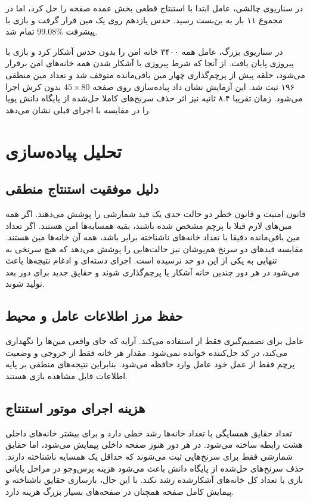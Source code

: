 \documentclass[10.5pt]{exam}
\begin{document}
در سناریوی چالشی، عامل ابتدا با استنتاج قطعی بخش عمده صفحه را حل کرد، اما در مجموع ۱۱ بار به بن‌بست رسید. حدس یازدهم روی یک مین قرار گرفت و بازی با پیشرفت
$99.08\%$
تمام شد.

در سناریوی بزرگ، عامل همه ۳۴۰۰ خانه امن را بدون حدس آشکار کرد و بازی با پیروزی پایان یافت. از آنجا که شرط پیروزی با آشکار شدن همه خانه‌های امن برقرار می‌شود، حلقه پیش از پرچم‌گذاری چهار مین باقی‌مانده متوقف شد و تعداد مین منطقی ۱۹۶ ثبت شد. این آزمایش نشان داد پیاده‌سازی روی صفحه
$45\times80$
بدون کرش اجرا می‌شود. زمان تقریبا ۸.۴ ثانیه نیز اثر حذف سرنخ‌های کاملا حل‌شده از پایگاه دانش پویا را در مقایسه با اجرای قبلی نشان می‌دهد.


\section{تحلیل پیاده‌سازی}
\subsection{دلیل موفقیت استنتاج منطقی}
قانون امنیت و قانون خطر دو حالت حدی یک قید شمارشی را پوشش می‌دهند. اگر همه مین‌های لازم قبلا با پرچم مشخص شده باشند، بقیه همسایه‌ها امن هستند. اگر تعداد مین باقی‌مانده دقیقا با تعداد خانه‌های ناشناخته برابر باشد، همه آن خانه‌ها مین هستند. مقایسه قیدهای دو سرنخ هم‌پوشان نیز حالت‌هایی را پوشش می‌دهد که هیچ سرنخی به تنهایی به یکی از این دو حد نرسیده است. اجرای دسته‌ای و ادغام نتیجه‌ها باعث می‌شود در هر دور چندین خانه آشکار یا پرچم‌گذاری شوند و حقایق جدید برای دور بعد تولید شوند.

\subsection{حفظ مرز اطلاعات عامل و محیط}
عامل برای تصمیم‌گیری فقط از
استفاده می‌کند. آرایه
که جای واقعی مین‌ها را نگهداری می‌کند، در کد حل‌کننده خوانده نمی‌شود. مقدار هر خانه فقط از خروجی
و وضعیت پرچم فقط از عمل خود عامل وارد حافظه می‌شود. بنابراین نتیجه‌های منطقی بر پایه اطلاعات قابل مشاهده بازی هستند.

\subsection{هزینه اجرای موتور استنتاج}
تعداد حقایق همسایگی با تعداد خانه‌ها رشد خطی دارد و برای بیشتر خانه‌های داخلی هشت رابطه ساخته می‌شود. در هر دور هنوز صفحه داخلی پیمایش می‌شود، اما حقایق شمارشی فقط برای سرنخ‌هایی ثبت می‌شوند که حداقل یک همسایه ناشناخته دارند. حذف سرنخ‌های حل‌شده از پایگاه دانش باعث می‌شود هزینه پرس‌وجو در مراحل پایانی بازی با تعداد کل خانه‌های آشکارشده رشد نکند. با این حال، بازسازی حقایق ناشناخته و پیمایش کامل صفحه همچنان در صفحه‌های بسیار بزرگ هزینه دارد.
\end{document}

